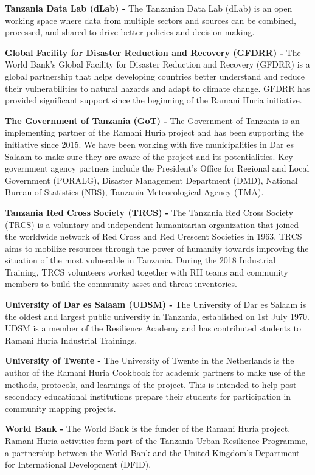 \documentclass[a4paper,12pt,twoside]{article}
\begin{document}
\begin{multicols}
\textbf{Tanzania Data Lab (dLab) -} The Tanzanian Data Lab (dLab) is an open working space where data from multiple sectors and sources can be combined, processed, and shared to drive better policies and decision-making. 

\textbf{Global Facility for Disaster Reduction and Recovery (GFDRR) -} The World Bank’s Global Facility for Disaster Reduction and Recovery (GFDRR) is a global partnership that helps developing countries better understand and reduce their vulnerabilities to natural hazards and adapt to climate change. GFDRR has provided significant support since the beginning of the Ramani Huria initiative.

\textbf{The Government of Tanzania (GoT) -} The Government of Tanzania is an implementing partner of the Ramani Huria project and has been supporting the initiative since 2015. We have been working with five municipalities in Dar es Salaam to make sure they are aware of the project and its potentialities. Key government agency partners include the President’s Office for Regional and Local Government (PORALG), Disaster Management Department (DMD), National Bureau of Statistics (NBS), Tanzania Meteorological Agency (TMA).

\textbf{Tanzania Red Cross Society (TRCS) -} The Tanzania Red Cross Society (TRCS) is a voluntary and independent humanitarian organization that joined the worldwide network of Red Cross and Red Crescent Societies in 1963. TRCS aims to mobilize resources through the power of humanity towards improving the situation of the most vulnerable in Tanzania. During the 2018 Industrial Training, TRCS volunteers worked together with RH teams and community members to build the community asset and threat inventories.

\textbf{University of Dar es Salaam (UDSM) -} The University of Dar es Salaam is the oldest and largest public university in Tanzania, established on 1st July 1970. UDSM is a member of the Resilience Academy and has contributed students to Ramani Huria Industrial Trainings. 

\textbf{University of Twente -} The University of Twente in the Netherlands is the author of the Ramani Huria Cookbook for academic partners to make use of the methods, protocols, and learnings of the project. This is intended to help post-secondary educational institutions prepare their students for participation in community mapping projects. 

\textbf{World Bank -} The World Bank is the funder of the Ramani Huria project. Ramani Huria activities form part of the Tanzania Urban Resilience Programme, a partnership between the World Bank and the United Kingdom’s Department for International Development (DFID).
\end{multicols}
\end{document}
